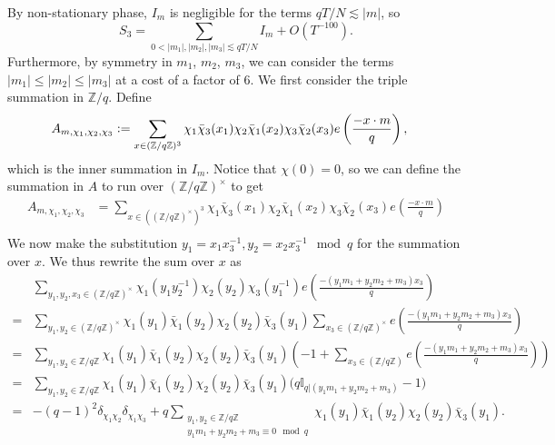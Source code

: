 By non-stationary phase, $I_m$ is negligible for the terms $qT/N\lesssim |m|$, so 
\begin{equation}
    S_3 = \sum_{0<|m_1|,|m_2|,|m_3|\lesssim qT/N} I_m + O(T^{-100}).
\end{equation}
Furthermore, by symmetry in $m_1$, $m_2$, $m_3$, we can consider the terms $|m_1|\leq |m_2|\leq |m_3|$ at a cost of a factor of $6$.
We first consider the triple summation in $\mathbb{Z}/q$. Define \begin{align*}
    A_{m,\chi_1,\chi_2,\chi_3}&\mathrel{\mathop:}= \sum_{x\in (\mathbb{Z}/q\mathbb{Z})^3}\chi_1\bar{\chi}_3(x_1)\chi_2\bar{\chi}_1(x_2)\chi_3\bar{\chi}_2(x_3) e\left(\frac{-x\cdot m}{q}\right),
\end{align*}
which is the inner summation in $I_m$.
Notice that $\chi(0)=0$, so we can define the summation in $A$ to run over $(\mathbb{Z}/q\mathbb{Z})^\times$ to get 
\begin{align*}
    A_{m,\chi_1,\chi_2,\chi_3}&= \sum_{x\in ((\mathbb{Z}/q\mathbb{Z})^\times)^3}\chi_1\bar{\chi}_3(x_1)\chi_2\bar{\chi}_1(x_2)\chi_3\bar{\chi}_2(x_3) e\left(\frac{-x\cdot m}{q}\right)\\
\end{align*}
We now make the substitution $y_1=x_1x_3^{-1}, y_2=x_2x_3^{-1} \mod q$ for the summation over $x$.
We thus rewrite the sum over $x$ as 
\begin{align*}
    &\sum_{y_1,y_2,x_3\in (\mathbb{Z}/q\mathbb{Z})^\times}
    \chi_1(y_1y_2^{-1})\chi_2(y_2)\chi_3(y_1^{-1})e\left(\frac{-(y_1m_1+y_2m_2+m_3)x_3}{q}\right)\\
    =&
    \sum_{y_1,y_2\in (\mathbb{Z}/q\mathbb{Z})^\times}\chi_1(y_1)\bar{\chi}_1(y_2)\chi_2(y_2)\bar{\chi}_3(y_1)\sum_{x_3\in (\mathbb{Z}/q\mathbb{Z})^\times}e\left(\frac{-(y_1m_1+y_2m_2+m_3)x_3}{q}\right)\\
    =&	\sum_{y_1,y_2\in \mathbb{Z}/q\mathbb{Z}}\chi_1(y_1)\bar{\chi}_1(y_2)\chi_2(y_2)\bar{\chi}_3(y_1)\left(-1+\sum_{x_3\in (\mathbb{Z}/q\mathbb{Z})}e\left(\frac{-(y_1m_1+y_2m_2+m_3)x_3}{q}\right)\right)\\
    =&\sum_{y_1,y_2\in\mathbb{Z}/q\mathbb{Z}}\chi_1(y_1)\bar{\chi}_1(y_2)\chi_2(y_2)\bar{\chi}_3(y_1) \Big(q \mathbb{I}_{q|(y_1m_1+y_2m_2+m_3)}-1\Big)\\
    =&  - (q-1)^2 \delta_{\chi_1\chi_2}\delta_{\chi_1\chi_3}+q \sum_{\substack{y_1,y_2 \in\mathbb{Z}/q\mathbb{Z} \\ y_1m_1+y_2m_2+m_3\equiv 0 \mod q}}\chi_1(y_1)\bar{\chi}_1(y_2)\chi_2(y_2)\bar{\chi}_3(y_1).
\end{align*}
